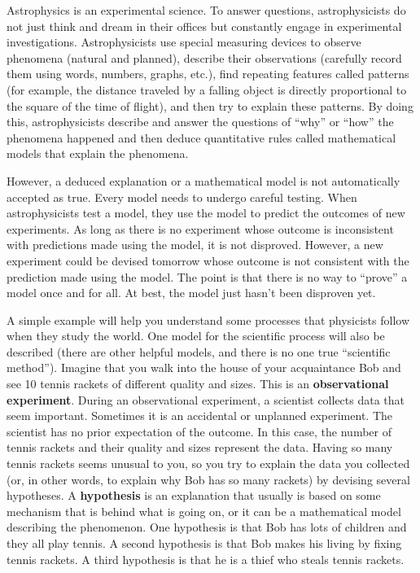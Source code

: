 Astrophysics is an experimental science. To answer questions, astrophysicists do not just think and dream in their offices but constantly engage in experimental investigations. Astrophysicists use special measuring devices to observe phenomena (natural and planned), describe their observations (carefully record them using words, numbers, graphs, etc.), find repeating features called patterns (for example, the distance traveled by a falling object is directly proportional to the square of the time of flight), and then try to explain these patterns. By doing this, astrophysicists describe and answer the questions of ``why'' or ``how'' the phenomena happened and then deduce quantitative rules called mathematical models that explain the phenomena.

However, a deduced explanation or a mathematical model is not automatically accepted as true. Every model needs to undergo careful testing. When astrophysicists test a model, they use the model to predict the outcomes of new experiments. As long as there is no experiment whose outcome is inconsistent with predictions made using the model, it is not disproved. However, a new experiment could be devised tomorrow whose outcome is not consistent with the prediction made using the model. The point is that there is no way to ``prove'' a model once and for all. At best, the model just hasn't been disproven yet.

A simple example will help you understand some processes that physicists follow when they study the world. One model for the scientific process will also be described (there are other helpful models, and there is no one true ``scientific method''). Imagine that you walk into the house of your acquaintance Bob and see 10 tennis rackets of different quality and sizes. This is an \textbf{observational experiment}. During an observational experiment, a scientist collects data that seem important. Sometimes it is an accidental or unplanned experiment. The scientist has no prior expectation of the outcome. In this case, the number of tennis rackets and their quality and sizes represent the data. Having so many tennis rackets seems unusual to you, so you try to explain the data you collected (or, in other words, to explain why Bob has so many rackets) by devising several hypotheses. A \textbf{hypothesis} is an explanation that usually is based on some mechanism that is behind what is going on, or it can be a mathematical model describing the phenomenon. One hypothesis is that Bob has lots of children and they all play tennis. A second hypothesis is that Bob makes his living by fixing tennis rackets. A third hypothesis is that he is a thief who steals tennis rackets.

